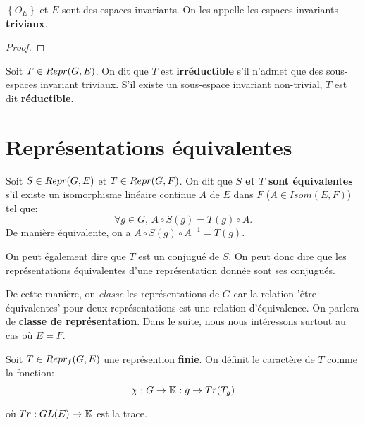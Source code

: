 \begin{proposition}
	$\left\{ O_{E} \right\}$ et $E$ sont des espaces invariants. On les appelle
	les espaces invariants \textbf{triviaux}.
\end{proposition}

\begin{proof}

\end{proof}

\begin{definition} 
	Soit $T \in Repr(G, E)$. On dit que $T$ est \textbf{irréductible} s'il
	n'admet que des sous-espaces invariant triviaux. S'il existe un sous-espace
	invariant non-trivial, $T$ est dit \textbf{réductible}.
\end{definition}

\section{Représentations équivalentes}

\begin{definition}
	Soit $S \in Repr(G, E)$ et $T \in Repr(G, F)$.
	On dit que \textbf{$S$ et $T$ sont équivalentes} s'il existe un isomorphisme
	linéaire continue $A$ de $E$ dans $F$ ($A \in Isom(E, F)$) tel que:
	\begin{equation}
		\forall g \in G, \, A \circ S(g) = T(g) \circ A.
	\end{equation}
	De manière équivalente, on a $A \circ S(g) \circ A^{-1} = T(g)$.

	On peut également dire que $T$ est un conjugué de $S$. On peut donc dire que
	les représentations équivalentes d'une représentation donnée sont ses
	conjugués.
\end{definition}

De cette manière, on \textit{classe} les représentations de $G$ car la
relation 'être équivalentes' pour deux représentations est une relation
d'équivalence. On parlera de \textbf{classe de représentation}.
Dans le suite, nous nous intéressons surtout au cas où $E = F$.

\begin{definition}
	Soit $T \in Repr_{f}(G, E)$ une représention \textbf{finie}.
	On définit le caractère de $T$ comme la fonction:
	\begin{equation}
		\chi : G \rightarrow \mathbb{K} : g \rightarrow Tr(T_{g})
	\end{equation}

	où $Tr : GL(E) \rightarrow \mathbb{K}$ est la trace.
\end{definition}

